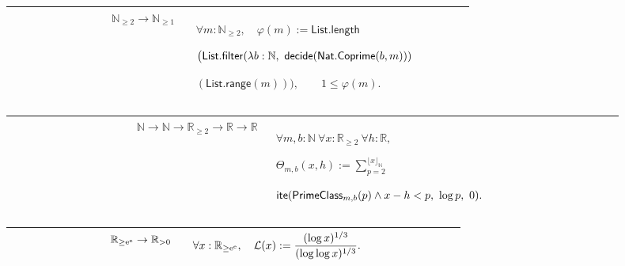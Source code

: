 \documentclass[12pt,reqno]{amsart}
\theoremstyle{blueplain}
\numberwithin{equation}{section}
\begin{document}
{\scriptsize \setlength{\parskip}{0pt}\nointerlineskip
\noindent 
\begin{tabular}{|@{}>{\centering\arraybackslash}m{0.19251\linewidth}|>{\centering\arraybackslash}m{0.16845\linewidth}|>{\centering\arraybackslash}m{0.53904\linewidth}|}
\hline
{\hypertarget{def:Totient}{$\varphi$}} & {$\mathbb{N}_{\ge2}\to\mathbb{N}%
_{\ge1}$} & {$\displaystyle \forall m:\mathbb{N}_{\ge2},\quad\varphi(m):=%
\mathsf{List.length}$ \par$\displaystyle \bigl(\mathsf{List.filter}(\lambda
b:\mathbb{N},\ \mathsf{decide}(\hyperlink{def:Nat.Coprime}{\mathsf{%
Nat.Coprime} }(b,m)))$ \par$\displaystyle (\mathsf{List.range}(m))\bigr)%
,\qquad1\le\varphi(m).$} \\ \hline
\end{tabular}
}

{\scriptsize \setlength{\parskip}{0pt}\nointerlineskip
\noindent 
\begin{tabular}{|@{}>{\centering\arraybackslash}m{0.19251\linewidth}|>{\centering\arraybackslash}m{0.16845\linewidth}|>{\centering\arraybackslash}m{0.53904\linewidth}|}
\hline
{\hypertarget{def:Theta}{$\Theta$}} & {$\mathbb{N}\to\mathbb{N}\to\mathbb{R}%
_{\ge2}\to\mathbb{R}\to\mathbb{R}$} & {$\displaystyle \forall m,b:\mathbb{N}%
\ \forall x:\mathbb{R}_{\ge2}\ \forall h:\mathbb{R},$ \par$\displaystyle %
\Theta_{m,b}(x,h):=\sum_{p=2}^{\lfloor x\rfloor_{\mathbb{N}}}$ \par$%
\displaystyle \mathsf{ite}(\hyperlink{def:PrimeClass}{\mathsf{PrimeClass} }%
_{m,b}(p)\wedge x-h<p,\ \log p,\ 0).$} \\ \hline
\end{tabular}
}

{\scriptsize \setlength{\parskip}{0pt}\nointerlineskip
\noindent 
\begin{tabular}{|@{}>{\centering\arraybackslash}m{0.19251\linewidth}|>{\centering\arraybackslash}m{0.16845\linewidth}|>{\centering\arraybackslash}m{0.53904\linewidth}|}
\hline
{\hypertarget{def:LogScale}{$\mathcal{L}$}} & {$\mathbb{R}_{\ge\mathrm{e}^{%
\mathrm{e}}}\to\mathbb{R}_{>0}$} & {$\displaystyle \forall x:\mathbb{R}_{\ge%
\mathrm{e}^{\mathrm{e}}},\quad\mathcal{L}(x):=\frac{(\log x)^{1/3}}{%
(\log\log x)^{1/3}}.$} \\ \hline
\end{tabular}
}
\end{document}
